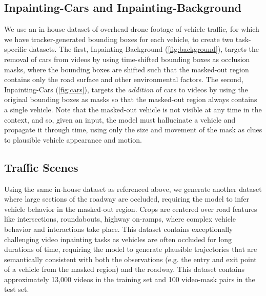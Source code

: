 \subsection{Inpainting-Cars and Inpainting-Background}
We use an in-house dataset of overhead drone footage of vehicle traffic, for which we have tracker-generated bounding boxes for each vehicle, to create two task-specific datasets. The first, Inpainting-Background (\cref{fig:background}), targets the removal of cars from videos by using time-shifted bounding boxes as occlusion masks, where the bounding boxes are shifted such that the masked-out region contains only the road surface and other environmental factors. The second, Inpainting-Cars (\cref{fig:cars}), targets the \emph{addition} of cars to videos by using the original bounding boxes as masks so that the masked-out region always contains a single vehicle. Note that the masked-out vehicle is not visible at any time in the context, and so,  given an input, the model must hallucinate a vehicle and propagate it through time, using only the size and movement of the mask as clues to plausible vehicle appearance and motion.
\subsection{Traffic Scenes}
Using the same in-house dataset as referenced above, we generate another dataset where large sections of the roadway are occluded, requiring the model to infer vehicle behavior in the masked-out region. Crops are centered over road features like intersections, roundabouts, highway on-ramps, \etc where complex vehicle behavior and interactions take place. This dataset contains exceptionally challenging video inpainting tasks as vehicles are often occluded for long durations of time, requiring the model to generate plausible trajectories that are semantically consistent with both the observations (e.g. the entry and exit point of a vehicle from the masked region) and the roadway. This dataset contains approximately 13,000 videos in the training set and 100 video-mask pairs in the test set. 
